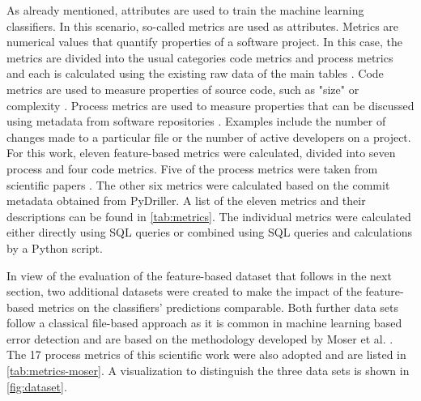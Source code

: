 As already mentioned, attributes are used to train the machine learning classifiers. In this scenario, so-called metrics are used as attributes. Metrics are numerical values that quantify properties of a software project. In this case, the metrics are divided into the usual categories code metrics and process metrics and each is calculated using the existing raw data of the main tables \cite{Rahman2013}. Code metrics are used to measure properties of source code, such as "size" or complexity \cite{Rahman2013}. Process metrics are used to measure properties that can be discussed using metadata from software repositories \cite{Rahman2013}. Examples include the number of changes made to a particular file or the number of active developers on a project. For this work, eleven feature-based metrics were calculated, divided into seven process and four code metrics. Five of the process metrics were taken from scientific papers \cite{Rahman2013,Queiroz2016}. The other six metrics were calculated based on the commit metadata obtained from PyDriller. A list of the eleven metrics and their descriptions can be found in \autoref{tab:metrics}. The individual metrics were calculated either directly using SQL queries or combined using SQL queries and calculations by a Python script.

In view of the evaluation of the feature-based dataset that follows in the next section, two additional datasets were created to make the impact of the feature-based metrics on the classifiers' predictions comparable. Both further data sets follow a classical file-based approach as it is common in machine learning based error detection and are based on the methodology developed by Moser et al. \cite{Moser2008}. The 17 process metrics of this scientific work were also adopted and are listed in \autoref{tab:metrics-moser}. A visualization to distinguish the three data sets is shown in \autoref{fig:dataset}.


